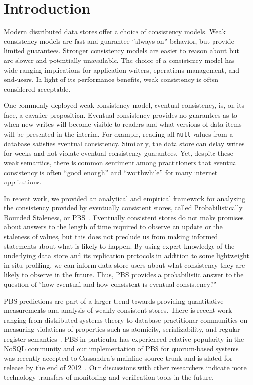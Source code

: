 \section{Introduction}

Modern distributed data stores offer a choice of consistency
models. Weak consistency models are fast and guarantee ``always-on''
behavior, but provide limited guarantees. Stronger consistency models
are easier to reason about but are slower and potentially
unavailable. The choice of a consistency model has wide-ranging implications
for application writers, operations management, and
end-users. In light of its performance benefits, weak
consistency is often considered acceptable.

One commonly deployed weak consistency model, eventual
consistency, is, on its face, a cavalier proposition. Eventual
consistency provides no guarantees as to when new writes will become
visible to readers and what versions of data items will be presented
in the interim. For example, reading all \texttt{null} values from a
database satisfies eventual consistency. Similarly, the data store can
delay writes for weeks and not violate eventual
consistency guarantees. Yet, despite these weak semantics, there is
common sentiment among practitioners that eventual consistency is
often ``good enough'' and ``worthwhile'' for many
internet applications.

In recent work, we provided an analytical and empirical framework for
analyzing the consistency provided by eventually consistent stores,
called Probabilistically Bounded Staleness, or
PBS~\cite{pbs-vldb2012}. Eventually consistent stores do not make promises
about answers to the length of time required to observe an update or
the staleness of values, but this does not preclude us from making
informed statements about what is likely to happen. By using expert
knowledge of the underlying data store and its replication protocols
in addition to some lightweight in-situ profiling, we can inform data
store users about what consistency they are likely to observe in the
future. Thus, PBS provides a probabilistic answer to the question 
of ``how eventual and how consistent is eventual consistency?''

PBS predictions are part of a larger trend towards providing
quantitative measurements and analysis of weakly consistent
stores. There is recent work ranging from distributed systems theory
to database practitioner communities on measuring violations of
properties such as atomicity, serializability, and regular register
semantics~\cite{hotdep}. PBS in particular has experienced relative
popularity in the NoSQL community and our implementation of PBS for
quorum-based systems was recently accepted to Cassandra's mainline
source trunk and is slated for release by the end of
2012~\cite{cassandra-pbs-patch}. Our discussions with other
researchers indicate more technology transfers of monitoring
and verification tools in the future.

